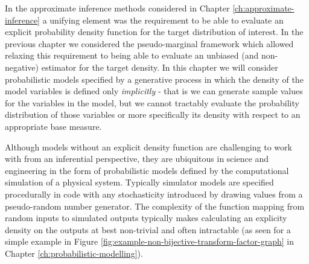 In the approximate inference methods considered in Chapter \ref{ch:approximate-inference} a unifying element was the requirement to be able to evaluate an explicit probability density function for the target distribution of interest. In the previous chapter we considered the pseudo-marginal framework which allowed relaxing this requirement to being able to evaluate an unbiased (and non-negative) estimator for the target density. In this chapter we will consider probabilistic models specified by a generative process in which the density of the model variables is defined only \emph{implicitly} \citep{beaumont2002approximate,gourieroux1993indirect,diggle1984monte} - that is we can generate sample values for the variables in the model, but we cannot tractably evaluate the probability distribution of those variables or more specifically its density with respect to an appropriate base measure. 

Although models without an explicit density function are challenging to work with from an inferential perspective, they are ubiquitous in science and engineering in the form of probabilistic models defined by the computational simulation of a physical system. Typically simulator models are specified procedurally in code with any stochasticity introduced by drawing values from a pseudo-random number generator. %
The complexity of the function mapping from random inputs to simulated outputs typically makes calculating an explicity density on the outputs at best non-trivial and often intractable (as seen for a simple example in Figure \ref{fig:example-non-bijective-transform-factor-graph} in Chapter \ref{ch:probabilistic-modelling}).

